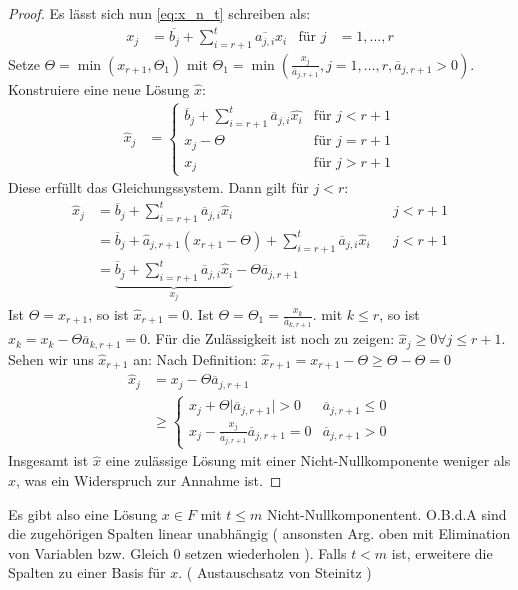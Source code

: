 \begin{proof}
Es lässt sich nun \eqref{eq:x_n_t} schreiben als:
\begin{align}
x_j &= \overline{b_j} + \sum_{i=r+1}^t \overline{a_{j,i}} x_i  &\text{für } j &={1,\dotsc,r}
\end{align}
Setze $\Theta = \min( x_{r+1}, \Theta_1)$ mit $\Theta_1 = \min( \frac{x_j}{\overline{a}_{j,r+1}}, j=1,\dotsc,r, \overline{a}_{j,r+1}>0 )$.
Konstruiere eine neue Lösung $\hat{x}$:
\begin{align}
\hat{x}_j &= \begin{cases}
\overline{b}_j + \sum_{i=r+1}^t \overline{a}_{j,i} \hat{x_i} & \text{für } j < r+1 \\
x_j - \Theta & \text{für }  j=r+1\\
x_j & \text{für }  j>r+1
\end{cases}
\end{align}
Diese erfüllt das Gleichungssystem.
Dann gilt für $j<r$:
\begin{align}
\hat{x}_j &= \overline{b}_j + \sum_{i=r+1}^t \overline{a}_{j,i} \hat{x}_i && j < r+1 \\
&= \overline{b}_j + \hat{a}_{j,r+1}(x_{r+1} - \Theta ) + \sum_{i=r+1}^t \overline{a}_{j,i} \hat{x}_i && j < r+1 \\
&= \underbrace{ \overline{b}_j + \sum_{i=r+1}^t \overline{a}_{j,i}\hat{x}_i }_{x_j} - \Theta\overline{a}_{j,r+1}
\end{align}
Ist $\Theta = x_{r+1}$, so ist $\hat{x}_{r+1} = 0$. Ist $\Theta = \Theta_1 = \frac{x_k}{\overline{a}_{k,r+1}}$. mit $k \leq r$, so ist %
 $\hat{x}_k = x_k - \Theta \overline{a}_{k,r+1} = 0$.
Für die Zulässigkeit ist noch zu zeigen: $\hat{x}_j \geq 0 \forall j \leq r + 1$.
Sehen wir uns $\hat{x}_{r+1}$ an:
Nach Definition: $\hat{x}_{r+1} = x_{r+1} - \Theta \geq \Theta - \Theta = 0$
\begin{align}
\hat{x}_j &= x_j - \Theta\overline{a}_{j,r+1} \\
&\geq \begin{cases}
 x_j + \Theta \lvert \overline{a}_{j,r+1} \rvert > 0 & \overline{a}_{j,r+1} \leq 0 \\
 x_j - \frac{x_j}{\overline{a}_{j,r+1}} \overline{a}_{j,r+1} = 0 & \overline{a}_{j,r+1} > 0
\end{cases}
\end{align}
Insgesamt ist $\hat{x}$ eine zulässige Lösung mit einer Nicht-Nullkomponente weniger als $x$, was ein Widerspruch zur Annahme ist.
\end{proof}
Es gibt also eine Lösung $x \in F$ mit $t\leq m$ Nicht-Nullkomponentent. O.B.d.A sind die zugehörigen Spalten linear unabhängig ( ansonsten Arg. oben mit Elimination von Variablen bzw. Gleich 0 setzen wiederholen ).
Falls $t < m$ ist, erweitere die Spalten zu einer Basis für $x$. ( Austauschsatz von Steinitz )

